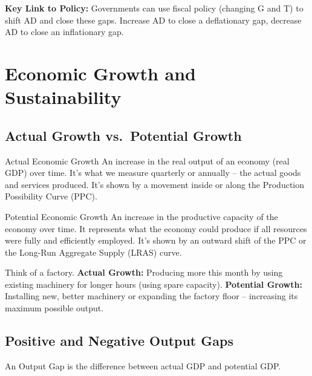 \documentclass[11pt, a4paper, twoside]{book}
\begin{document}
\begin{coreidea}
\textbf{Key Link to Policy:} Governments can use fiscal policy (changing G and T) to shift AD and close these gaps. Increase AD to close a deflationary gap, decrease AD to close an inflationary gap.
\end{coreidea}

\section{Economic Growth and Sustainability}

\subsection{Actual Growth vs.\ Potential Growth}

\begin{keyterm}{Actual Economic Growth}
An increase in the real output of an economy (real GDP) over time. It's what we measure quarterly or annually -- the actual goods and services produced. It's shown by a movement inside or along the Production Possibility Curve (PPC).
\end{keyterm}

\begin{keyterm}{Potential Economic Growth}
An increase in the productive capacity of the economy over time. It represents what the economy could produce if all resources were fully and efficiently employed. It's shown by an outward shift of the PPC or the Long-Run Aggregate Supply (LRAS) curve.
\end{keyterm}

\begin{example}
Think of a factory. \textbf{Actual Growth:} Producing more this month by using existing machinery for longer hours (using spare capacity). \textbf{Potential Growth:} Installing new, better machinery or expanding the factory floor -- increasing its maximum possible output.
\end{example}

\subsection{Positive and Negative Output Gaps}

An Output Gap is the difference between actual GDP and potential GDP.
\end{document}
